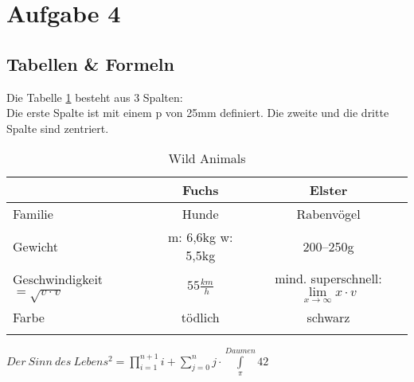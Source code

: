 \documentclass[a4paper, pdftex, ngerman, 11pt]{article}
\begin{document}
\section{Aufgabe 4}
\subsection{Tabellen \& Formeln}
Die Tabelle \ref{tab:ani} besteht aus 3 Spalten:\\
Die erste Spalte ist mit einem p von 25mm definiert. Die zweite und die dritte Spalte sind zentriert.

\begin{longtable}{p{25mm}|c|c}
& Fuchs & Elster\\
\hline
\hline
Familie & Hunde & Rabenvögel\\
\hline
Gewicht & m: 6,6kg w: 5,5kg & 200--250g\\
\hline
Geschwindigkeit $ = \sqrt{v\cdot v}$ & $55\frac{km}{h}$ & mind. superschnell: $\lim\limits_{x \rightarrow \infty} x \cdot v$ \\
\hline
Farbe & tödlich & schwarz\\
\hline
\caption{Wild Animals}
\label{tab:ani}
\end{longtable}

$Der~Sinn~des~Lebens^2 = \prod\limits_{i=1}^{n+1} i + \sum_{j=0}^{n} j \cdot \int\limits_{\pi}^{Daumen} 42$
\end{document}
